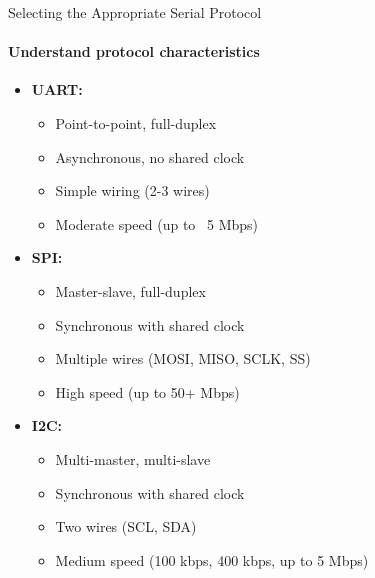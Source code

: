\begin{KR}{Selecting the Appropriate Serial Protocol}
\paragraph{Understand protocol characteristics}
\begin{itemize}
    \item \textbf{UART:}
    \begin{itemize}
        \item Point-to-point, full-duplex
        \item Asynchronous, no shared clock
        \item Simple wiring (2-3 wires)
        \item Moderate speed (up to ~5 Mbps)
    \end{itemize}
    \item \textbf{SPI:}
    \begin{itemize}
        \item Master-slave, full-duplex
        \item Synchronous with shared clock
        \item Multiple wires (MOSI, MISO, SCLK, SS)
        \item High speed (up to 50+ Mbps)
    \end{itemize}
    \item \textbf{I2C:}
    \begin{itemize}
        \item Multi-master, multi-slave
        \item Synchronous with shared clock
        \item Two wires (SCL, SDA)
        \item Medium speed (100 kbps, 400 kbps, up to 5 Mbps)
    \end{itemize}
\end{itemize}


\end{KR}
